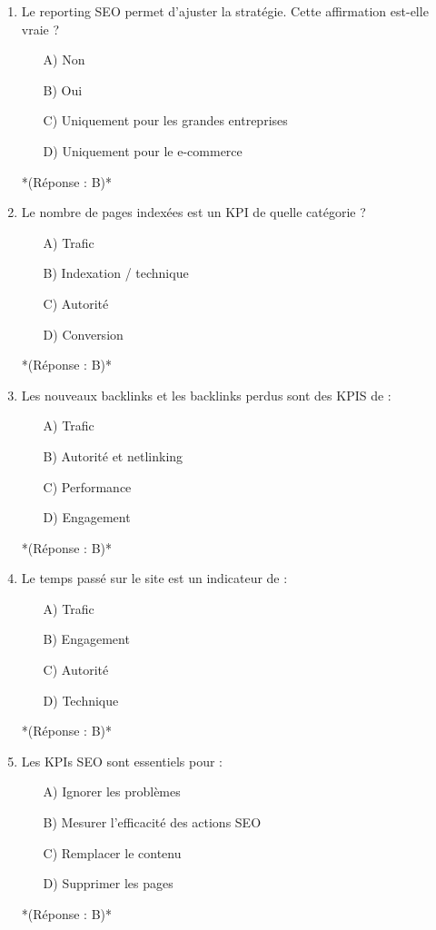 \documentclass[12pt,a4paper,twoside]{report}
\begin{document}
\begin{enumerate}
    \item Le reporting SEO permet d'ajuster la stratégie. Cette affirmation est-elle vraie ?
    \begin{itemize}
        \item[A)] Non
        \item[B)] Oui
        \item[C)] Uniquement pour les grandes entreprises
        \item[D)] Uniquement pour le e-commerce
    \end{itemize}
    *(Réponse : B)*

    \item Le nombre de pages indexées est un KPI de quelle catégorie ?
    \begin{itemize}
        \item[A)] Trafic
        \item[B)] Indexation / technique
        \item[C)] Autorité
        \item[D)] Conversion
    \end{itemize}
    *(Réponse : B)*

    \item Les nouveaux backlinks et les backlinks perdus sont des KPIS de :
    \begin{itemize}
        \item[A)] Trafic
        \item[B)] Autorité et netlinking
        \item[C)] Performance
        \item[D)] Engagement
    \end{itemize}
    *(Réponse : B)*

    \item Le temps passé sur le site est un indicateur de :
    \begin{itemize}
        \item[A)] Trafic
        \item[B)] Engagement
        \item[C)] Autorité
        \item[D)] Technique
    \end{itemize}
    *(Réponse : B)*

    \item Les KPIs SEO sont essentiels pour :
    \begin{itemize}
        \item[A)] Ignorer les problèmes
        \item[B)] Mesurer l'efficacité des actions SEO
        \item[C)] Remplacer le contenu
        \item[D)] Supprimer les pages
    \end{itemize}
    *(Réponse : B)*


\end{enumerate}
\end{document}
